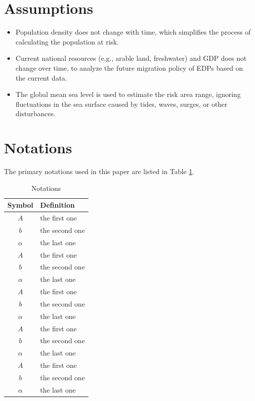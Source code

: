 \documentclass[12pt]{article}  %
\begin{document}
\newpage
\section{Assumptions}

\begin{itemize}
     \item  
     Population density does not change with time, which simplifies the process of calculating the population at risk.
     
     \item  
     Current national resources (e.g., arable land, freshwater) and GDP does not change over time,  to analyze the future migration policy of EDPs based on the current data.
     
     
     \item  
     The global mean sea level is used to estimate the risk area range, ignoring fluctuations in the sea surface caused by tides, waves, surges, or other disturbances.
\end{itemize}






\newpage
\section{Notations}
The primary notations used in this paper are listed in Table \ref{tb:notation}.
\begin{table}[!htbp]
\begin{center}
\caption{Notations}
\begin{tabular}{cl}
	\toprule
	\multicolumn{1}{m{3cm}}{\centering Symbol}
	&\multicolumn{1}{m{8cm}}{\centering Definition}\\
	\midrule
	$A$&the first one\\
	$b$&the second one\\
	$\alpha$ &the last one\\
	$A$&the first one\\
	$b$&the second one\\
	$\alpha$ &the last one\\
	$A$&the first one\\
	$b$&the second one\\
	$\alpha$ &the last one\\
	$A$&the first one\\
	$b$&the second one\\
	$\alpha$ &the last one\\
	$A$&the first one\\
	$b$&the second one\\
	$\alpha$ &the last one\\
	\bottomrule
\end{tabular}\label{tb:notation}
\end{center}
\end{table}
\newpage
\end{document}
